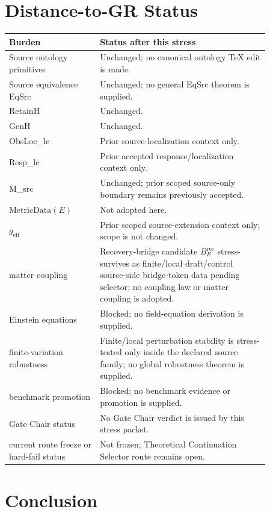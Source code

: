 \documentclass[11pt]{article}
\newcommand{\geff}{g_{\mathrm{eff}}}
\newcommand{\MetricData}{\mathrm{MetricData}}
\newcommand{\BErec}{B_E^{\mathrm{rec}}}
\begin{document}
\section{Distance-to-GR Status}

\begin{longtable}{p{0.30\linewidth}p{0.56\linewidth}}
\toprule
Burden & Status after this stress \\
\midrule
Source ontology primitives & Unchanged; no canonical ontology TeX edit is made. \\
Source equivalence EqSrc & Unchanged; no general EqSrc theorem is supplied. \\
RetainH & Unchanged. \\
GenH & Unchanged. \\
ObsLoc\_lc & Prior source-localization context only. \\
Resp\_lc & Prior accepted response/localization context only. \\
M\_src & Unchanged; prior scoped source-only boundary remains previously accepted. \\
\(\MetricData(E)\) & Not adopted here. \\
\(\geff\) & Prior scoped source-extension context only; scope is not changed. \\
matter coupling & Recovery-bridge candidate \(\BErec\) stress-survives as finite/local draft/control source-side bridge-token data pending selector; no coupling law or matter coupling is adopted. \\
Einstein equations & Blocked; no field-equation derivation is supplied. \\
finite-variation robustness & Finite/local perturbation stability is stress-tested only inside the declared source family; no global robustness theorem is supplied. \\
benchmark promotion & Blocked; no benchmark evidence or promotion is supplied. \\
Gate Chair status & No Gate Chair verdict is issued by this stress packet. \\
current route freeze or hard-fail status & Not frozen; Theoretical Continuation Selector route remains open. \\
\bottomrule
\end{longtable}

\section{Conclusion}
\end{document}
